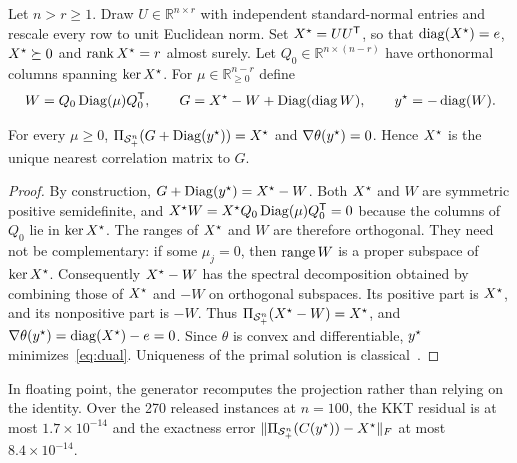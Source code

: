 \begin{definition}\label{def:family}
Let $n>r\ge1$. Draw $U\in\mathbb{R}^{n\times r}$ with independent
standard-normal entries and rescale every row to unit Euclidean norm. Set
$X^\star=UU^{\mathsf T}$, so that $\operatorname{diag}(X^\star)=e$, $X^\star\succeq0$ and $\operatorname{rank}X^\star=r$
almost surely. Let $Q_0\in\mathbb{R}^{n\times(n-r)}$ have orthonormal columns
spanning $\ker X^\star$. For $\mu\in\mathbb{R}^{n-r}_{\ge0}$ define
\begin{equation}\label{eq:construction}
  W = Q_0\operatorname{Diag}(\mu)Q_0^{\mathsf T},\qquad
  G = X^\star - W + \operatorname{Diag}(\operatorname{diag} W),\qquad
  y^\star = -\operatorname{diag}(W).
\end{equation}
\end{definition}

\begin{proposition}[Exactness]\label{prop:exact}
For every $\mu\ge0$, $\Pi_{\mathcal{S}_+^n}(G+\operatorname{Diag}(y^\star))=X^\star$ and $\nabla\theta(y^\star)=0$.
Hence $X^\star$ is the unique nearest correlation matrix to $G$.
\end{proposition}
\begin{proof}
By construction, $G+\operatorname{Diag}(y^\star)=X^\star-W$. Both $X^\star$ and $W$ are symmetric
positive semidefinite, and $X^\star W=X^\star Q_0\operatorname{Diag}(\mu)Q_0^{\mathsf T}=0$ because
the columns of $Q_0$ lie in $\ker X^\star$. The ranges of $X^\star$ and $W$ are
therefore orthogonal. They need not be complementary: if some $\mu_j=0$, then
$\operatorname{range} W$ is a proper subspace of $\ker X^\star$. Consequently $X^\star-W$ has the
spectral decomposition obtained by combining those of $X^\star$ and $-W$ on
orthogonal subspaces. Its positive part is $X^\star$, and its nonpositive part is
$-W$. Thus $\Pi_{\mathcal{S}_+^n}(X^\star-W)=X^\star$, and
$\nabla\theta(y^\star)=\operatorname{diag}(X^\star)-e=0$. Since $\theta$ is convex and
differentiable, $y^\star$ minimizes~\eqref{eq:dual}. Uniqueness of the primal
solution is classical~\cite{higham2002nearest,qisun2006quadratically}.
\end{proof}

In floating point, the generator recomputes the projection rather than relying
on the identity. Over the 270 released instances at $n=100$, the KKT residual
is at most $1.7\times10^{-14}$ and the exactness error
$\lVert \Pi_{\mathcal{S}_+^n}(C(y^\star))-X^\star\rVert_F$ at most $8.4\times10^{-14}$.

